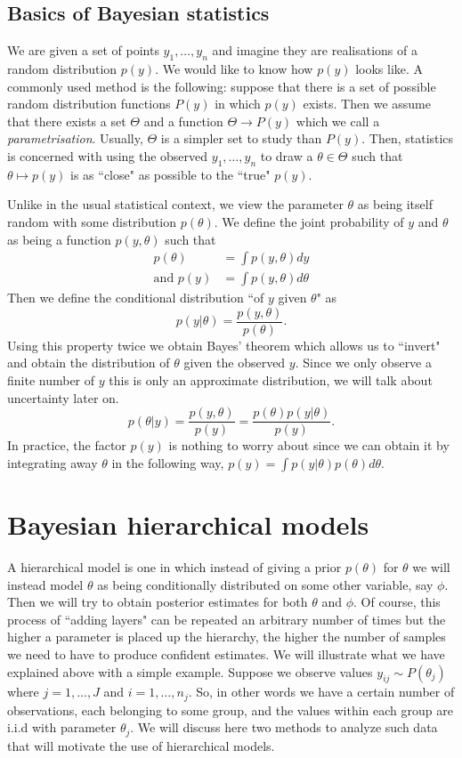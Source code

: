 \documentclass{scrartcl}
\begin{document}
\subsection{Basics of Bayesian statistics}
We are given a set of points $y_1, \dots, y_n$ and imagine they are
realisations of a random distribution $p(y)$.
We would like to know how $p(y)$ looks like.
A commonly used method is the following: suppose that there is a set of
possible random distribution functions $P(y)$ in which $p(y)$ exists.
Then we assume that there exists a set $\Theta$ and a function $\Theta \to P(y)$
which we call a \emph{parametrisation}.
Usually, $\Theta$ is a simpler set to study than $P(y)$.
Then, statistics is concerned with using the observed $y_1,\dots,y_n$ to draw a
$\theta \in \Theta$ such that $\theta \mapsto p(y)$ is as ``close" as possible
to the ``true" $p(y)$.

Unlike in the usual statistical context, we view the parameter $\theta$ as
being itself random with some distribution $p(\theta)$. We define the joint
probability of $y$ and $\theta$ as being a function $p(y,\theta)$ such that
\begin{align*}
	p(\theta)        & = \int p(y,\theta) dy      \\
	\text{and } p(y) & = \int p(y,\theta) d\theta
\end{align*}
Then we define the conditional distribution ``of $y$ given $\theta$" as
\[
	p(y|\theta) = \frac{p(y,\theta)}{p(\theta)}.
\]
Using this property twice we obtain Bayes' theorem which allows us to ``invert"
and obtain the distribution of $\theta$ given the observed $y$. Since we only
observe a finite number of $y$ this is only an approximate distribution, we
will talk about uncertainty later on.
\[
	p(\theta|y) = \frac{p(y,\theta)}{p(y)} = \frac{p(\theta)p(y|\theta)}{p(y)}.
\]
In practice, the factor $p(y)$ is nothing to worry about since we can obtain it
by integrating away $\theta$ in the following way, $p(y) = \int
	p(y|\theta)p(\theta)d\theta$.

\section{Bayesian hierarchical models}
A hierarchical model is one in which instead of giving a prior $p(\theta)$ for
$\theta$ we will instead model $\theta$ as being conditionally distributed on
some other variable, say $\phi$. Then we will try to obtain posterior estimates
for both $\theta$ and $\phi$. Of course, this process of ``adding layers" can
be repeated an arbitrary number of times but the higher a parameter is placed
up the hierarchy, the higher the number of samples we need to have to produce
confident estimates.
We will illustrate what we have explained above with a simple example.
Suppose we observe values $y_{ij} \sim P(\theta_j)$ where $j=1,\dots,J$ and
$i=1,\dots,n_j$. So, in other words we have a certain number of observations,
each belonging to some group, and the values within each group are i.i.d with
parameter $\theta_j$. We will discuss here two methods to analyze such data
that will motivate the use of hierarchical models.
\end{document}
